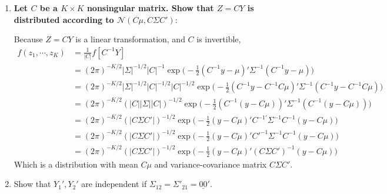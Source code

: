 \documentclass{article}[12pt]
\begin{document}
\begin{enumerate}
	\item \textbf{Let $C$ be a $K \times K$ nonsingular matrix. Show that $Z = CY$ is distributed according to $\mathscr{N} (C \mu,C \Sigma C')$}:

	Because $Z = CY$ is a linear transformation, and $C$ is invertible,
	\begin{align*}
		f(z_1, \cdots, z_K) &= \frac{1}{|C|} f[C^{-1}Y] \\
		&= (2 \pi)^{-K/2} |\Sigma|^{-1/2} |C|^{-1} \exp \bigg( -\frac{1}{2}(C^{-1}y - \mu)' \Sigma^{-1} (C^{-1}y - \mu) \bigg) \\
		&= (2 \pi)^{-K/2} |\Sigma|^{-1/2} |C|^{-1/2} |C|^{-1/2} \exp \bigg( -\frac{1}{2}(C^{-1}y - C^{-1}C\mu)' \Sigma^{-1} (C^{-1}y - C^{-1}C\mu) \bigg) \\
		&= (2 \pi)^{-K/2} (|C||\Sigma||C|)^{-1/2} \exp \bigg( -\frac{1}{2}(C^{-1}(y - C\mu))' \Sigma^{-1} (C^{-1}(y - C\mu)) \bigg) \\
		&= (2 \pi)^{-K/2} (|C\Sigma C'|)^{-1/2} \exp \bigg( -\frac{1}{2}(y - C\mu)' C^{-1'} \Sigma^{-1} C^{-1}(y - C\mu) \bigg) \\
		&= (2 \pi)^{-K/2} (|C\Sigma C'|)^{-1/2} \exp \bigg( -\frac{1}{2}(y - C\mu)' C'^{-1} \Sigma^{-1} C^{-1}(y - C\mu) \bigg) \\
		&= (2 \pi)^{-K/2} (|C\Sigma C'|)^{-1/2} \exp \bigg( -\frac{1}{2}(y - C\mu)' (C \Sigma C')^{-1}(y - C\mu) \bigg)
	\end{align*}
	Which is a distribution with mean $C\mu$ and variance-covariance matrix $C\Sigma C'$.

	\item Show that $Y_1', Y_2'$ are independent if $\Sigma_{12} = \Sigma'_{21} = \underline{00}'$.


\end{enumerate}
\end{document}
